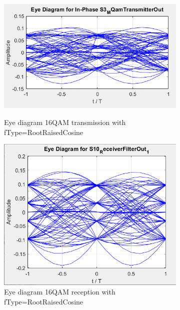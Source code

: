 \begin{figure}[H]
	\centering
        \begin{subfigure}{.55\textwidth}
        \centering
        	\includegraphics[scale=0.55]{./lib/m_qam_transmitter/figure_PLoureiro/16QAM_RootRaisedCosine_in.png}
        \label{Example_RootRaisedCoisine_in}\caption{Eye diagram 16QAM transmission with fType=RootRaisedCosine }
        \end{subfigure}%
        \begin{subfigure}{.55\textwidth}
        \centering
        	\includegraphics[scale=0.45]{./lib/m_qam_transmitter/figure_PLoureiro/16QAM_RootRaisedCosine_out.png}
        	\caption{Eye diagram 16QAM reception with fType=RootRaisedCosine}\label{Example_RootRaisedCoisine_out}
        \end{subfigure}
        \caption{}\label{RootRaisedCosine}
\end{figure}

